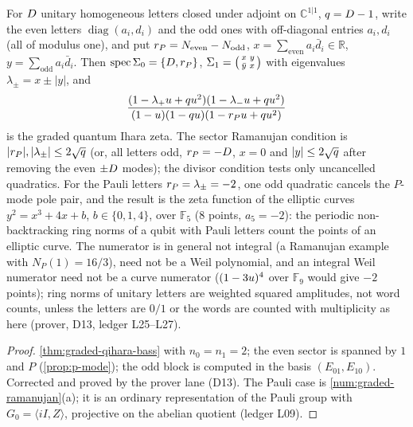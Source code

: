 \begin{proposition}
\label{prop:qubit-graded-zeta}
For $D$ unitary homogeneous letters closed under adjoint on $\mathbb C^{1|1}$, $q = D-1$, write
the even letters $\operatorname{diag}(a_i,d_i)$ and the odd ones with off-diagonal entries $a_i,d_i$
(all of modulus one), and put $r_{P} = N_{\mathrm{even}}-N_{\mathrm{odd}}$, $x =
\sum_{\mathrm{even}}a_i\bar d_i\in\mathbb R$, $y = \sum_{\mathrm{odd}}a_i\bar d_i$. Then
$\operatorname{spec}\Sigma_0 = \{D,r_{P}\}$, $\Sigma_1 = \bigl(\begin{smallmatrix}x&y\\
\bar y&x\end{smallmatrix}\bigr)$ with eigenvalues $\lambda_\pm = x\pm|y|$, and
\[
  \frac{(1-\lambda_+u+qu^2)(1-\lambda_-u+qu^2)}{(1-u)(1-qu)(1-r_{P}u+qu^2)}
\]
is the graded quantum Ihara zeta. The sector Ramanujan condition is $|r_{P}|,|\lambda_\pm|\le
2\sqrt{q}$ (or, all letters odd, $r_{P} = -D$, $x = 0$ and $|y|\le2\sqrt{q}$ after
removing the even $\pm D$ modes); the divisor condition tests only uncancelled quadratics. For the
Pauli letters $r_{P} = \lambda_\pm = -2$, one odd quadratic cancels the $P$-mode pole pair, and the
result is the zeta function of the elliptic curves $y^2 = x^3+4x+b$, $b\in\{0,1,4\}$, over
$\mathbb F_5$ ($8$ points, $a_5 = -2$): the periodic non-backtracking ring norms of a qubit with
Pauli letters count the points of an elliptic curve. The numerator is in general not integral (a
Ramanujan example with $N_P(1) = 16/3$), need not be a Weil polynomial, and an integral Weil
numerator need not be a curve numerator ($(1-3u)^4$ over $\mathbb F_9$ would give $-2$ points);
ring norms of unitary letters are weighted squared amplitudes, not word counts, unless the letters
are $0/1$ or the words are counted with multiplicity as here (prover, D13, ledger L25--L27).
\end{proposition}
\begin{proof}
\cref{thm:graded-qihara-bass} with $n_0 = n_1 = 2$; the even sector is spanned by $1$ and $P$
(\cref{prop:p-mode}); the odd block is computed in the basis $(E_{01},E_{10})$. Corrected and
proved by the prover lane (D13). The Pauli case is \cref{num:graded-ramanujan}(a); it is an
ordinary representation of the Pauli group with $G_0 = \langle iI,Z\rangle$, projective on the
abelian quotient (ledger L09).
\end{proof}
